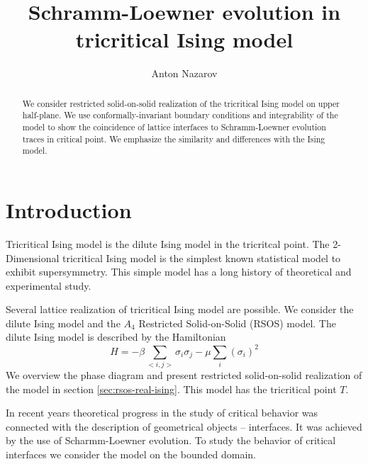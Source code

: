 \documentclass[12pt]{article}
\begin{document}
\title{Schramm-Loewner evolution in tricritical Ising model}
\author{Anton Nazarov}%

\maketitle

\begin{abstract}
  We consider restricted solid-on-solid realization of the tricritical Ising model on upper
  half-plane. We use conformally-invariant boundary conditions  and integrability of the model to
  show the coincidence of lattice interfaces to Schramm-Loewner evolution traces in critical point.
  We emphasize the similarity and differences with the Ising model. 
\end{abstract}

\section{Introduction}
\label{sec:introduction}

Tricritical Ising model is the dilute Ising model in the tricritcal point.
The 2-Dimensional tricritical Ising model is the simplest known statistical model to exhibit
supersymmetry. This simple model has a long history of theoretical and experimental study. 

Several lattice realization of tricritical Ising model are possible. We consider the dilute Ising model and the $A_4$
Restricted Solid-on-Solid (RSOS) model. The dilute Ising model is described by the Hamiltonian 
\begin{equation}
  \label{eq:1}
  H = -\beta \sum_{<i,j>}\sigma_i\sigma_j - \mu \sum_{i}(\sigma_i)^2  
\end{equation}
We overview the phase diagram and present restricted solid-on-solid realization of the model in
section \ref{sec:rsos-real-ising}. This model has the tricritical point $T$. 


In recent
years theoretical progress in the study of critical behavior was connected with the description of
geometrical objects -- interfaces. It was achieved by the use of Scharmm-Loewner evolution. To study
the behavior of critical interfaces we consider the model on the bounded domain. 
\end{document}
